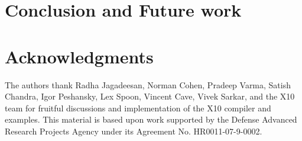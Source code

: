 \documentclass{llncs}
\begin{document}
\section{Conclusion and Future work}\label{sec:future}\label{sec:conclusions}
%


\section*{Acknowledgments}

The authors thank Radha Jagadeesan,
Norman Cohen, Pradeep Varma,
Satish Chandra, Igor Peshansky,
Lex Spoon, Vincent Cave, Vivek Sarkar,
and the X10 team for fruitful discussions and implementation of
the X10 compiler and examples.
This material is based upon work supported by the Defense
Advanced Research Projects Agency under its Agreement No.
HR0011-07-9-0002.
\fi




\balance


% 
\end{document}
